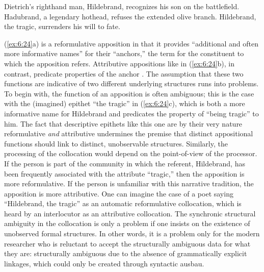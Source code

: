 \ea%
    \label{ex:6:24}

      \ea Dietrich’s righthand man, Hildebrand, recognizes his son on the battlefield.
\ex Hadubrand, a legendary hothead, refuses the extended olive branch.
\ex Hildebrand, the tragic, surrenders his will to fate.
    \z
    \z

\noindent (\ref{ex:6:24}a) is a reformulative apposition in that it provides “additional and often more informative names” for their “anchors,” the term for the constituent to which the apposition refers. Attributive appositions like in (\ref{ex:6:24}b), in contrast, predicate properties of the anchor \citep[1]{Griffiths2015}. The assumption that these two functions are indicative of two different underlying structures runs into problems. To begin with, the function of an apposition is often ambiguous; this is the case with the (imagined) epithet “the tragic” in (\ref{ex:6:24}c), which is both a more informative name for Hildebrand and predicates the property of “being tragic” to him. The fact that descriptive epithets like this one are by their very nature reformulative \textit{and} attributive undermines the premise that distinct appositional functions should link to distinct, unobservable structures. Similarly, the processing of the collocation would depend on the point-of-view of the processor. If the person is part of the community in which the referent, Hildebrand, has been frequently associated with the attribute “tragic,” then the apposition is more reformulative. If the person is unfamiliar with this narrative tradition, the apposition is more attributive. One can imagine the case of a poet saying “Hildebrand, the tragic” as an automatic reformulative collocation, which is heard by an interlocutor as an attributive collocation. The synchronic structural ambiguity in the collocation is only a problem if one insists on the existence of unobserved formal structures. In other words, it is a problem only for the modern researcher who is reluctant to accept the structurally ambiguous data for what they are: structurally ambiguous due to the absence of grammatically explicit linkages, which could only be created through syntactic ausbau.

